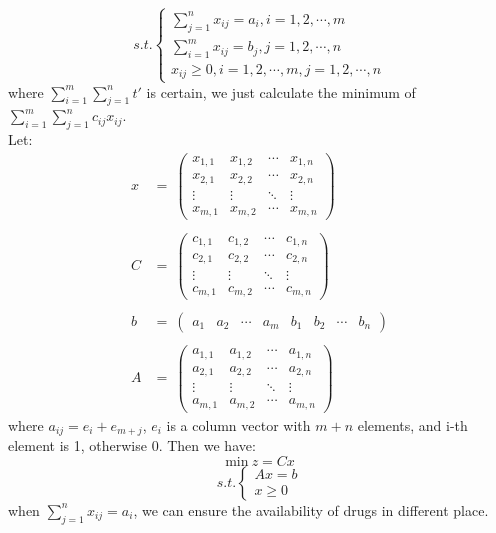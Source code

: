 $$
s.t. \left\{
\begin{array}{l}
  \sum_{j=1}^{n}x_{ij}=a_i,i=1,2,\cdots,m \\
  \sum_{i=1}^{m}x_{ij}=b_j,j=1,2,\cdots,n \\
  x_{ij}\geq 0,i=1,2,\cdots,m, j=1,2,\cdots,n
\end{array}\right.
$$
where $ \sum_{i=1}^{m}\sum_{j=1}^{n}t' $ is certain, 
we just calculate the minimum of 
$ \sum_{i=1}^{m}\sum_{j=1}^{n}c_{ij}x_{ij} $.\\
Let:
$$
\begin{array}{ll}
x & = ~\begin{pmatrix}
	  x_{1,1} & x_{1,2} & \cdots & x_{1,n} \\
	  x_{2,1} & x_{2,2} & \cdots & x_{2,n} \\
	  \vdots  & \vdots  & \ddots & \vdots  \\
	  x_{m,1} & x_{m,2} & \cdots & x_{m,n}
	 \end{pmatrix}\\\\
C & = ~\begin{pmatrix}
	  c_{1,1} & c_{1,2} & \cdots & c_{1,n} \\
	  c_{2,1} & c_{2,2} & \cdots & c_{2,n} \\
	  \vdots  & \vdots  & \ddots & \vdots  \\
	  c_{m,1} & c_{m,2} & \cdots & c_{m,n}
	 \end{pmatrix}\\\\
b & = ~\begin{pmatrix}
	  a_1 & a_2 & \cdots & a_m & b_1 & b_2 & \cdots & b_n
	 \end{pmatrix}\\\\
A & = ~\begin{pmatrix}
	  a_{1,1} & a_{1,2} & \cdots & a_{1,n} \\
	  a_{2,1} & a_{2,2} & \cdots & a_{2,n} \\
	  \vdots  & \vdots  & \ddots & \vdots  \\
	  a_{m,1} & a_{m,2} & \cdots & a_{m,n}
	 \end{pmatrix}
\end{array}
$$
where $ a_{ij}=e_i+e_{m+j} $, $ e_{i} $ is a column vector with
$ m+n $ elements, and i-th element is 1, otherwise 0. Then we
have:
$$
\mathrm{min}~z=Cx
$$
$$
s.t. \left\{\begin{array}{r}
  Ax=b\\
  x\geq 0
\end{array}\right.
$$
when $ \sum_{j=1}^{n}x_{ij}=a_i $, we can ensure the
availability of drugs in different place.